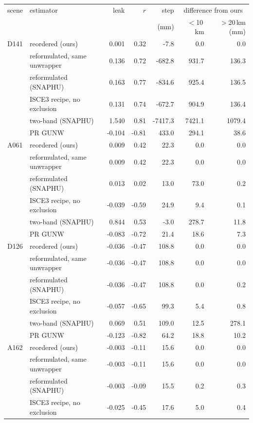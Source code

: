 \begin{tabular}{llrrrrr}
\toprule
scene & estimator & leak & $r$ & step & \multicolumn{2}{c}{difference from ours} \\
 & & & & (mm) & $<$10\,km & $>$20\,km (mm) \\
\midrule
D141 & reordered (ours) & 0.001 & 0.32 & -7.8 & 0.0 & 0.0 \\
 & reformulated, same unwrapper & 0.136 & 0.72 & -682.8 & 931.7 & 136.3 \\
 & reformulated (SNAPHU) & 0.163 & 0.77 & -834.6 & 925.4 & 136.5 \\
 & ISCE3 recipe, no exclusion & 0.131 & 0.74 & -672.7 & 904.9 & 136.4 \\
 & two-band (SNAPHU) & 1.540 & 0.81 & -7417.3 & 7421.1 & 1079.4 \\
 & PR GUNW & -0.104 & -0.81 & 433.0 & 294.1 & 38.6 \\
\midrule
A061 & reordered (ours) & 0.009 & 0.42 & 22.3 & 0.0 & 0.0 \\
 & reformulated, same unwrapper & 0.009 & 0.42 & 22.3 & 0.0 & 0.0 \\
 & reformulated (SNAPHU) & 0.013 & 0.02 & 13.0 & 73.0 & 0.2 \\
 & ISCE3 recipe, no exclusion & -0.039 & -0.59 & 24.9 & 9.4 & 0.1 \\
 & two-band (SNAPHU) & 0.844 & 0.53 & -3.0 & 278.7 & 11.8 \\
 & PR GUNW & -0.083 & -0.72 & 21.4 & 18.6 & 7.3 \\
\midrule
D126 & reordered (ours) & -0.036 & -0.47 & 108.8 & 0.0 & 0.0 \\
 & reformulated, same unwrapper & -0.036 & -0.47 & 108.8 & 0.0 & 0.0 \\
 & reformulated (SNAPHU) & -0.036 & -0.47 & 108.8 & 0.0 & 0.2 \\
 & ISCE3 recipe, no exclusion & -0.057 & -0.65 & 99.3 & 5.4 & 0.8 \\
 & two-band (SNAPHU) & 0.069 & 0.51 & 109.0 & 12.5 & 278.1 \\
 & PR GUNW & -0.123 & -0.82 & 64.2 & 18.8 & 10.2 \\
\midrule
A162 & reordered (ours) & -0.003 & -0.11 & 15.6 & 0.0 & 0.0 \\
 & reformulated, same unwrapper & -0.003 & -0.11 & 15.6 & 0.0 & 0.0 \\
 & reformulated (SNAPHU) & -0.003 & -0.09 & 15.5 & 0.2 & 0.3 \\
 & ISCE3 recipe, no exclusion & -0.025 & -0.45 & 17.6 & 5.0 & 0.4 \\

\end{tabular}
